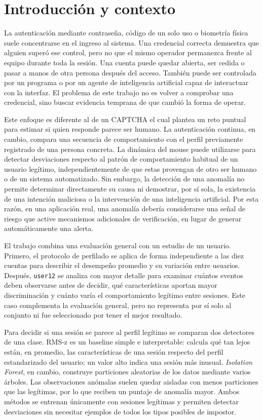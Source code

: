 \documentclass[11pt,letterpaper]{article}
\begin{document}
\section{Introducción y contexto}

La autenticación mediante contraseña, código de un solo uso o biometría física suele concentrarse en el ingreso al
sistema. Una credencial correcta demuestra que alguien superó ese control, pero no que el mismo operador permanezca
frente al equipo durante toda la sesión. Una cuenta puede quedar abierta, ser cedida o pasar a manos de otra persona
después del acceso. También puede ser controlada por un programa o por un agente de inteligencia artificial capaz de
interactuar con la interfaz. El problema de este trabajo no es volver a comprobar una credencial, sino buscar evidencia
temprana de que cambió la forma de operar.

Este enfoque es diferente al de un CAPTCHA el cual plantea un reto puntual para estimar si quien responde parece ser humano.
La autenticación continua, en cambio, compara una secuencia de comportamiento con el perfil previamente
registrado de una persona concreta. La dinámica del mouse puede utilizarse para detectar desviaciones respecto
al patrón de comportamiento habitual de un usuario legítimo, independientemente de que estas provengan de otro
ser humano o de un sistema automatizado. Sin embargo, la detección de una anomalía no permite determinar
directamente su causa ni demostrar, por sí sola, la existencia de una intención maliciosa o la intervención
de una inteligencia artificial. Por esta razón, en una aplicación real, una anomalía debería considerarse una
señal de riesgo que active mecanismos adicionales de verificación, en lugar de generar automáticamente una
alerta.

El trabajo combina una evaluación general con un estudio de un usuario. Primero, el protocolo de perfilado se aplica de
forma independiente a las diez cuentas para describir el desempeño promedio y su variación entre usuarios. Después,
\texttt{user12} se analiza con mayor detalle para examinar cuántos eventos deben observarse antes de decidir, qué
características aportan mayor discriminación y cuánto varía el comportamiento legítimo entre sesiones. Este caso
complementa la evaluación general, pero no representa por sí solo al conjunto ni fue seleccionado por tener el mejor
resultado.

Para decidir si una sesión se parece al perfil legítimo se comparan dos detectores de una clase. RMS-z es un baseline
simple e interpretable: calcula qué tan lejos están, en promedio, las características de una sesión respecto del
perfil estandarizado del usuario; un valor alto indica una sesión más inusual. \emph{Isolation Forest}, en cambio,
construye particiones aleatorias de los datos mediante varios árboles. Las observaciones anómalas suelen quedar
aisladas con menos particiones que las legítimas, por lo que reciben un puntaje de anomalía mayor. Ambos métodos se
entrenan únicamente con sesiones legítimas y permiten detectar desviaciones sin necesitar ejemplos de todos los tipos
posibles de impostor.
\end{document}
